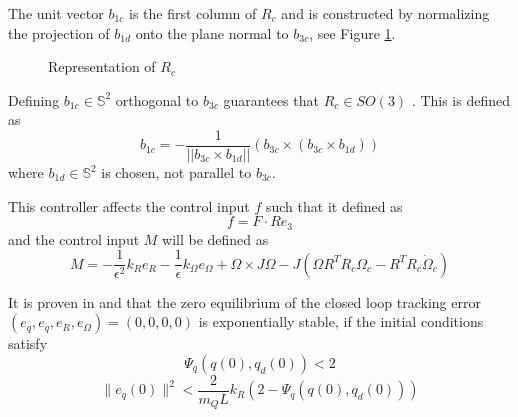 The unit vector $ b_{1c} $ is the first column of $ R_c $ and is constructed by normalizing the projection of $ b_{1d} $ onto the plane normal to $ b_{3c} $, see Figure \ref{fig:con.b1c}. 
\begin{figure}[h!]
	\centering
	\caption{Representation of $ R_c $\label{fig:con.b1c}}
\end{figure}	

Defining $ b_{1c}\in\mathbb{S}^2$ orthogonal to  $ b_{3c}$ guarantees that $ R_c \in SO(3) $ \cite{Lee2010c}.
This is defined as 
\begin{equation}\label{key}
b_{1c}=-\frac{1}{||b_{3c}\times b_{1d}||}(b_{3c}\times(b_{3c}\times b_{1d}))
\end{equation}
where $ b_{1d}\in \mathbb{S}^2 $ is chosen, not parallel to $ b_{3c} $. 
	
This controller affects the control input $ f $ such that it defined as
\begin{equation}\label{eq:con.fLoadatt}
f=F\cdot Re_3
\end{equation}
and the control input $ M $ will be defined as
\begin{equation}\label{eq:con.MLoadatt}
M = -\frac{1}{\epsilon^2}k_Re_R-\frac{1}{\epsilon}k_\Omega e_\Omega+\Omega\times J\Omega-J(\hat{\Omega}R^TR_c\Omega_c-R^TR_c\dot{\Omega}_c)
\end{equation} 

It is proven in \cite{Sreenath2013c} and \cite[Lemma 11.23]{Bullo2005} that the zero equilibrium of the closed loop tracking error $ (e_q,e_{\dot{q}},e_R,e_\Omega)=(0,0,0,0) $ is exponentially stable, if the initial conditions satisfy
\begin{equation}\label{eq:dom3}
\Psi_q(q(0),q_d(0))<2
\end{equation}
\begin{equation}\label{eq:dom4}
\parallel e_{\dot{q}}(0)\parallel^2<\frac{2}{m_QL}{k_R}(2-\Psi_q(q(0),q_d(0)))
\end{equation}

